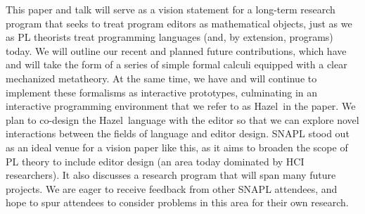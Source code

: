 \documentclass[letterpaper,USenglish]{lipics-v2016}
\newcommand{\Hazel}[0]{\textsf{Hazel}}
\newcommand{\HazelEnv}[0]{\Hazel}
\begin{document}
This paper and talk will serve as a vision statement for a long-term research
program that seeks to treat program editors as mathematical objects, just as we as PL theorists treat programming languages (and, by extension, programs) today. 
%
%
We will outline our recent and planned future contributions, which have and will take the form of
a series of simple formal calculi equipped with a clear mechanized
metatheory. 
%
At the same time, we have and will continue to implement these
formalisms as interactive prototypes, culminating in an interactive
programming environment that we refer to as \HazelEnv~in the paper. 
%
We plan to co-design the \HazelEnv~language
with the editor so that we can explore novel interactions between the fields of language and editor design. SNAPL stood out as an ideal venue for a vision paper like this, as it aims to broaden the scope of PL theory to include editor design (an area today dominated by HCI researchers). It also discusses a research program that will span many future projects. We are eager to receive feedback from other SNAPL attendees, and hope to spur attendees to consider problems in this area for their own research.

%

\end{document}
